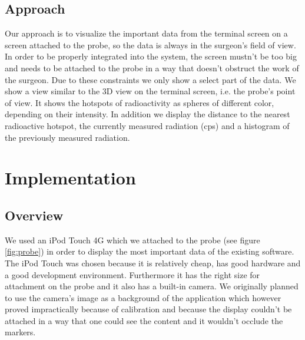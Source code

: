 \documentclass{scrartcl}
\newcommand{\red}[1]{{\color{red} #1}}
\newcommand{\refFigure}[1]{figure \ref{fig:#1}}
\begin{document}
\subsection{Approach}
Our approach is to visualize the important data from the terminal screen on a screen attached to the probe, so the data is always in the surgeon's field of view. In order to be properly integrated into the system, the screen mustn't be too big and needs to be attached to the probe in a way that doesn't obstruct the work of the surgeon. Due to these constraints we only show a select part of the data. We show a view similar to the 3D view on the terminal screen, i.e. the probe's point of view. It shows the hotspots of radioactivity as spheres of different color, depending on their intensity. In addition we display the distance to the nearest radioactive hotspot, the currently measured radiation (cps) and a histogram of the previously measured radiation.



\section{Implementation}

\subsection{Overview}
We used an iPod Touch 4G which we attached to the probe (see \refFigure{probe}) in order to display the most important data of the existing software.
The iPod Touch was chosen because it is relatively cheap, has good hardware and a good development environment. Furthermore it has the right size for attachment on the probe and it also has a built-in camera. We originally planned to use the camera's image as a background of the application which however proved impractically because of calibration and because the display couldn't be attached in a way that one could see the content and it wouldn't occlude the markers.
\end{document}
